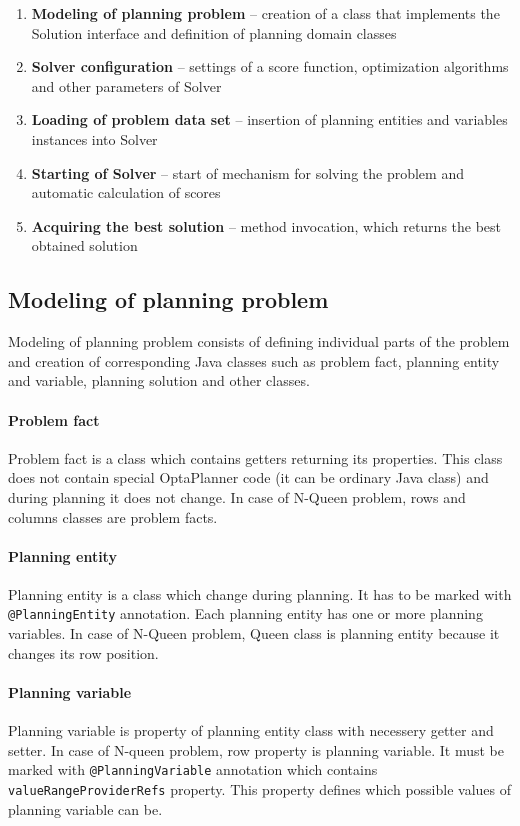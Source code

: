 \begin{enumerate}
\item \textbf{Modeling of planning problem} -- creation of a class that implements the Solution interface and definition of planning domain classes
\item \textbf{Solver configuration} -- settings of a score function, optimization algorithms and other parameters of Solver
\item \textbf{Loading of problem data set} -- insertion of planning entities and variables instances into Solver
\item \textbf{Starting of Solver} -- start of mechanism for solving the problem and automatic calculation of scores
\item \textbf{Acquiring the best solution} -- method invocation, which returns the best obtained solution
\end{enumerate}

\subsection{Modeling of planning problem}
Modeling of planning problem consists of defining individual parts of the problem and creation of corresponding Java classes such as problem fact, planning entity and variable, planning solution and other classes.

\paragraph{Problem fact}
Problem fact is a class which contains getters returning its properties. This class does not contain special OptaPlanner code (it can be ordinary Java class) and during planning it does not change. In case of N-Queen problem, rows and columns classes are problem facts.

\paragraph{Planning entity}
Planning entity is a class which change during planning. It has to be marked with \texttt{@PlanningEntity} annotation. Each planning entity has one or more planning variables. In case of N-Queen problem, Queen class is planning entity because it changes its row position.

\paragraph{Planning variable}
Planning variable is property of planning entity class with necessery getter and setter. In case of N-queen problem, row property is planning variable. It must be marked with \texttt{@PlanningVariable} annotation which contains \texttt{valueRangeProviderRefs} property. This property defines which possible values of planning variable can be.

